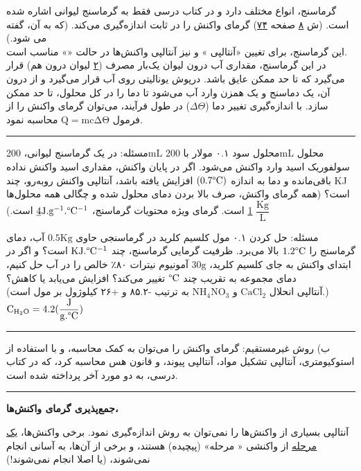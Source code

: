 \documentclass[a4paper,12pt]{article}
\makeatletter
\newcommand{\lin}{\vspace{4pt}\hrule\vspace{4pt}}
\def\extra{\rule{1ex}{0ex}}
\newcommand\censor{\@ifstar{\@cenmath}{\@centext}}
\newcommand\@cenmath[1]{%
	\protect\rule[-.3ex]{\widthofpbox{\extra$#1$}}{0.1ex}}
\newcommand\@centext[1]{%
	\protect\rule[-.3ex]{\widthofpbox{\extra#1}}{0.1ex}}
\makeatother
\begin{document}
گرماسنج، انواع مختلف دارد و در کتاب درسی فقط به گرماسنج لیوانی اشاره شده است. (ش \underline{۸} صفحه \underline{۷۴})
گرمای واکنش را در \censor{فشار} ثابت اندازه‌گیری می‌کند. (که به آن، \censor{$\Delta H$} گفته می شود.)\\
این گرما‌سنج، برای تغیین «آنتالپی \censor{انحلال}» و نیز آنتالپی واکنش‌ها در حالت «\censor{محلول}» مناسب است.\\
در این گرماسنج، مقداری آب درون لیوان یک‌بار مصرف (\underline{۲} لیوان درون هم) قرار می‌گیرد که تا حد ممکن عایق \censor{گرما} باشد. درپوش یونالیتی روی آب قرار می‌گیرد و از درون آن، یک دماسنج و یک همزن وارد آب می‌شود تا دما را در کل محلول، تا حد ممکن \censor{یکسان} سازد. با اندازه‌گیری تغییر دما ($\Delta\Theta$) در طول فرآیند، می‌توان گرمای واکنش را از فرمول
$\mathrm{Q=mc\Delta\Theta}$
محاسبه نمود.
\lin
مسئله: در یک گرماسنج لیوانی، 200mL محلول سود ۰.۱ مولار با 200mL محلول سولفوریک اسید وارد واکنش می‌شود. اگر در پایان واکنش، مقداری اسید واکنش نداده باقی‌مانده و دما به اندازه $\mathrm{(0.7\degree C)}$ افزایش یافته باشد، آنتالپی واکنش روبه‌رو، چند KJ است؟ \quad (همه گرمای واکنش، صرف بالا بردن دمای محلول شده و چگالی همه محلول‌ها
$\mathrm{\dfrac{Kg}{L}}$
\underline{1}
است. گرمای ویژه محتویات گرماسنج،
$\mathrm{\underline{4}J.g^{-1}.\degree C^{-1}}$
است.)
\begin{flushleft}
\end{flushleft}
\newpage
مسئله: حل کردن ۰.۱ مول کلسیم کلرید در گرما‌سنجی حاوی
$\mathrm{0.5Kg}$
آب، دمای گرماسنج را
$\mathrm{1.2\degree C}$
بالا می‌برد. ظرفیت گرمایی گرما‌سنج، چند
$\mathrm{KJ.\degree C^{-1}}$
است؟ و اگر در ابتدای واکنش به جای کلسیم کلرید، $\mathrm{30g}$ آمونیوم نیترات ۸۰٪ خالص را در آب حل کنیم، دمای مجموعه به تقریب چند
$\mathrm{\degree C}$
تغییر می‌کند؟ افزایش می‌یابد یا کاهش؟\\(آنتالپی انحلال
$\mathrm{CaCl_{2}}$
و
$\mathrm{NH_{4}NO_{3}}$
به ترتیب -۸۵.۲ و +۲۶ کیلوژول بر مول است.)
$\mathrm{C_{H_2O}=4.2(\dfrac{J}{g.\degree C})}$
\vspace{8em}
\lin
ب) روش غیرمستقیم: گرمای واکنش را می‌توان به کمک محاسبه، و با استفاده از استوکیومتری، آنتالپی تشکیل مواد، آنتالپی پیوند، و قانون هس محاسبه کرد، که در کتاب درسی، به دو مورد آخر پرداخته شده است.
\lin
\begin{center}
	\textbf{جمع‌پذیری گرمای واکنش‌ها، }
\end{center}
آنتالپی بسیاری از واکنش‌ها را نمی‌توان به روش \censor{تجربی} اندازه‌گیری نمود. برخی واکنش‌ها، \underline{یک مرحله} از واکنشی «\censor{چند} مرحله»  (پیچیده) هستند، و برخی از آن‌ها، به آسانی انجام نمی‌شوند، (یا اصلا انجام نمی‌شوند!)\\
\end{document}
